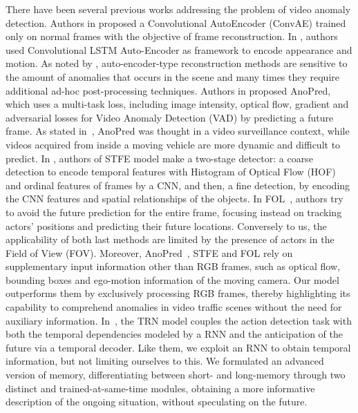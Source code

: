 There have been several previous works addressing the problem of video anomaly detection.
Authors in \cite{hasan2016learning} proposed a Convolutional AutoEncoder (ConvAE) trained only on normal frames with the objective of frame reconstruction.
In \cite{luo2017remembering,wang2018abnormal}, authors used Convolutional LSTM Auto-Encoder as framework to encode appearance and motion.
As noted by \cite{ramachandra2020survey}, auto-encoder-type reconstruction methods are sensitive to the amount of anomalies that occurs in the scene and many times they require additional ad-hoc post-processing techniques.
Authors in \cite{liu2018future} proposed AnoPred, which uses a multi-task loss, including image intensity, optical flow, gradient and adversarial losses for Video Anomaly Detection (VAD) by predicting a future frame.
As stated in~\cite{9712446}, AnoPred was thought in a video surveillance context, while videos acquired from inside a moving vehicle are more dynamic and difficult to predict.
In \cite{zhou_spatio-temporal_2022}, authors of STFE model make a two-stage detector: a coarse detection to encode temporal features with Histogram of Optical Flow (HOF) \cite{wang2013action} and ordinal features of frames by a CNN, and then, a fine detection, by encoding the CNN features and spatial relationships of the objects.
In FOL~\cite{9712446}, authors try to avoid the future prediction for the entire frame, focusing instead on tracking actors' positions and predicting their future locations.
Conversely to us, the applicability of both last methods are limited by the presence of actors in the Field of View (FOV).
Moreover, AnoPred~\cite{liu2018future}, STFE \cite{zhou_spatio-temporal_2022} and FOL \cite{9712446} rely on supplementary input information other than RGB frames, such as optical flow, bounding boxes and ego-motion information of the moving camera.
Our model outperforms them by exclusively processing RGB frames, thereby highlighting its capability to comprehend anomalies in video traffic scenes without the need for auxiliary information.
In~\cite{xu2019temporal}, the TRN model couples the action detection task with both the temporal dependencies modeled by a RNN and the anticipation of the future via a temporal decoder.
Like them, we exploit an RNN to obtain temporal information, but not limiting ourselves to this.
We formulated an advanced version of memory, differentiating between short- and long-memory through two distinct and trained-at-same-time modules, obtaining a more informative description of the ongoing situation, without speculating on the future.
